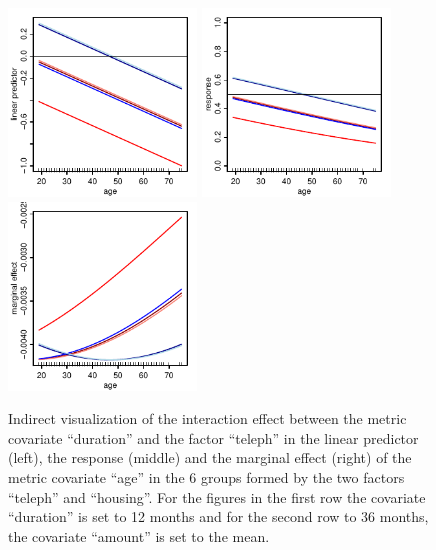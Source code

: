 \documentclass[nojss]{jss}
\newcommand{\quotes}[1]{``#1''}
\begin{document}
\begin{figure}[ht]
\includegraphics[width=5cm]{cd-age-link-2} \includegraphics[width=5cm]{cd-age-resp-2} \includegraphics[width=5cm]{cd-age-marg-2}
\caption{Indirect visualization of the interaction effect between the metric covariate \quotes{duration} and the factor \quotes{teleph} in the linear predictor (left), the response (middle) and the marginal effect (right) of the metric covariate \quotes{age} in the 6 groups formed by the two factors \quotes{teleph} and \quotes{housing}. For the figures in the first row the covariate \quotes{duration} is set to 12 months and for the second row to 36 months, the covariate \quotes{amount} is set to the mean.} \label{fig-cd-age-1}
\end{figure}
\end{document}
